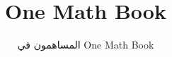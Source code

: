 \documentclass[11pt,a4paper,twoside,openany]{book}
\title{One Math Book}
\author{المساهمون في One Math Book}
\date{\bookdate}
\begin{document}
\frontmatter



\tableofcontents

\mainmatter





\appendix
\part{\omsolutionspart}




\backmatter
\printindex
\end{document}
